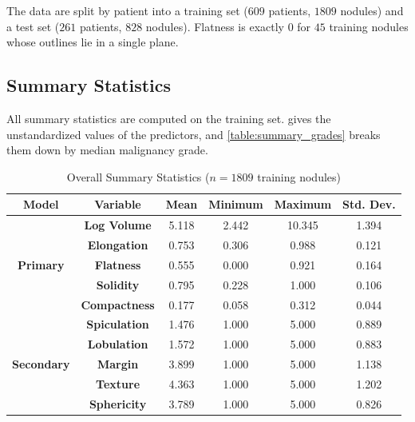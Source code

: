\documentclass[12pt]{article}
\begin{document}
The data are split by patient into a training set ($609$ patients,
$1809$ nodules) and a test set ($261$ patients, $828$ nodules).
Flatness is exactly $0$ for $45$ training nodules whose outlines lie
in a single plane.

\subsection{Summary Statistics}

All summary statistics are computed on the training set.
 gives the unstandardized values of the
predictors, and \cref{table:summary_grades} breaks them down by
median malignancy grade.

\begin{table}[H]
  \centering
  \begin{tabular}{|| c | c | c | c | c | c ||}
    \hline
    \textbf{Model}
    & \textbf{Variable} & \textbf{Mean}
    & \textbf{Minimum}
    & \textbf{Maximum} & \textbf{Std. Dev.} \\[0.5ex]
    \hline\hline
    \multirow{5}{*}{\textbf{Primary}}
    & \textbf{Log Volume} & 5.118 & 2.442 & 10.345 & 1.394 \\
    & \textbf{Elongation} & 0.753 & 0.306 & 0.988 & 0.121 \\
    & \textbf{Flatness} & 0.555 & 0.000 & 0.921 & 0.164 \\
    & \textbf{Solidity} & 0.795 & 0.228 & 1.000 & 0.106 \\
    & \textbf{Compactness} & 0.177 & 0.058 & 0.312 & 0.044 \\
    \hline
    \multirow{5}{*}{\textbf{Secondary}}
    & \textbf{Spiculation} & 1.476 & 1.000 & 5.000 & 0.889 \\
    & \textbf{Lobulation} & 1.572 & 1.000 & 5.000 & 0.883 \\
    & \textbf{Margin} & 3.899 & 1.000 & 5.000 & 1.138 \\
    & \textbf{Texture} & 4.363 & 1.000 & 5.000 & 1.202 \\
    & \textbf{Sphericity} & 3.789 & 1.000 & 5.000 & 0.826 \\
    \hline
  \end{tabular}
  \caption{Overall Summary Statistics ($n = 1809$ training nodules)}
  \label{table:summary_all}
\end{table}
\end{document}
